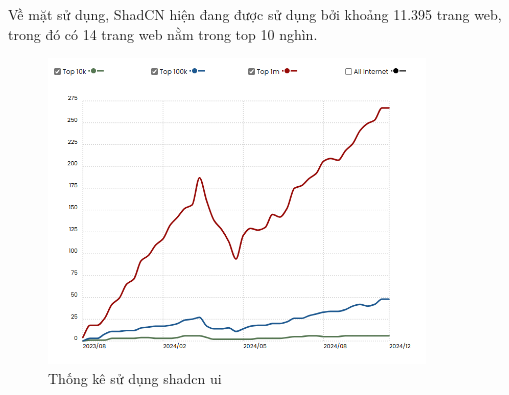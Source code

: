 \begin{enumerate}[(a)]
	      Về mặt sử dụng, ShadCN hiện đang được sử dụng bởi khoảng 11.395 trang web, trong đó có 14 trang web nằm trong top 10 nghìn.

	      \begin{figure}[H]
		      \centering
		      \includegraphics[width=10cm]{Images/shadcn-stats.png}
		      \vspace{0.5cm}
		      \caption{Thống kê sử dụng shadcn ui \cite{ShadcnUI}}
		      \label{fig:my_label}
	      \end{figure}


\end{enumerate}

